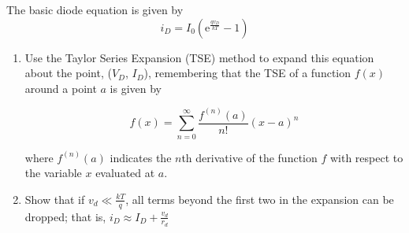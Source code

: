 \documentclass{article}
\begin{document}
The basic diode equation is given by
\begin{equation*}
    i_D = I_0(\mathrm{e}^\frac{qv_D}{kT} - 1)
\end{equation*}
\begin{enumerate}[label=(\alph*)]
    \item
        Use the Taylor Series Expansion (TSE) method to expand this equation
        about the point, ($V_D$, $I_D$), remembering that the TSE of a
        function $f(x)$ around a point $a$ is given by

        \begin{equation*}
            f(x) = \sum_{n = 0}^{\infty} \frac{f^{(n)}(a)}{n!} (x - a)^n
        \end{equation*}

        where $f^{(n)}(a)$ indicates the $n$th derivative of the function $f$
        with respect to the variable $x$ evaluated at $a$.

    \item
        Show that if $v_d \ll \frac{kT}{q}$, all terms beyond the first two in
        the expansion can be dropped; that is, $i_D \approx I_D +
        \frac{v_d}{r_d}$
\end{enumerate}
\end{document}
